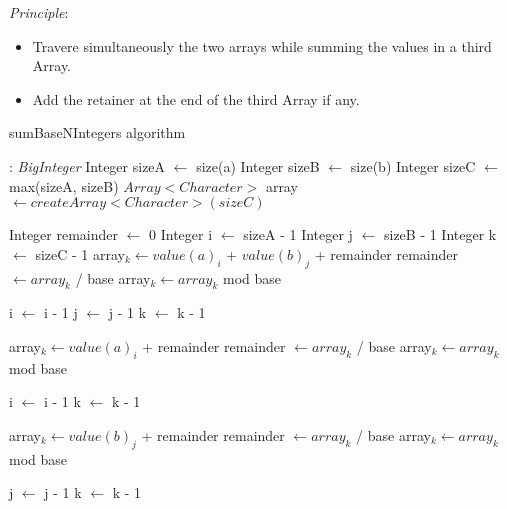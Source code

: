 \documentclass[book, nodocumentinfo]{upmethodology-document}
\begin{document}
\emph{Principle}:
\begin{itemize}
    \item Travere simultaneously the two arrays while summing the values in a third Array.
    \item Add the retainer at the end of the third Array if any.
\end{itemize}

\newpage

\begin{algorithm}[H]
    \caption{sumBaseNIntegers algorithm}
    \label{algo:basenintegerlist-sum-basen-integers}

    \begin{algorithmic}
         : \emph{BigInteger}
            \State Integer sizeA \(\leftarrow\) size(a)
            \State Integer sizeB \(\leftarrow\) size(b)
            \State Integer sizeC \(\leftarrow\) max(sizeA, sizeB)
            \State \(Array<Character>\) array \(\leftarrow createArray<Character>(sizeC)\)

            \State Integer remainder \(\leftarrow\) 0
            \State Integer i \(\leftarrow\) sizeA - 1
            \State Integer j \(\leftarrow\) sizeB - 1
            \State Integer k \(\leftarrow\) sizeC - 1
                \State array\(_k \leftarrow value(a)_i\) + \(value(b)_j\) + remainder
                \State remainder \(\leftarrow array_k\) / base
                \State array\(_k \leftarrow array_k\) mod base

                \State i \(\leftarrow\) i - 1
                \State j \(\leftarrow\) j - 1
                \State k \(\leftarrow\) k - 1
            \EndWhile

                \State array\(_k \leftarrow value(a)_i\) + remainder
                \State remainder \(\leftarrow array_k\) / base
                \State array\(_k \leftarrow array_k\) mod base

                \State i \(\leftarrow\) i - 1
                \State k \(\leftarrow\) k - 1
            \EndWhile

                \State array\(_k \leftarrow value(b)_j\) + remainder
                \State remainder \(\leftarrow array_k\) / base
                \State array\(_k \leftarrow array_k\) mod base

                \State j \(\leftarrow\) j - 1
                \State k \(\leftarrow\) k - 1
            \EndWhile


\end{algorithmic}
\end{algorithm}
\end{document}
